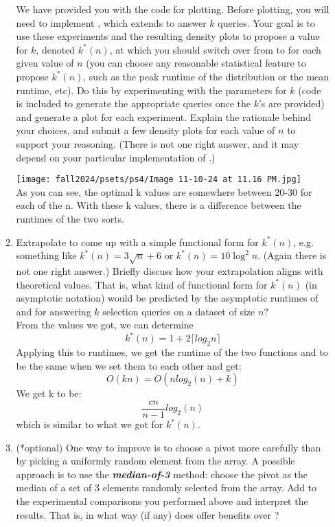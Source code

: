 \documentclass[11pt]{article}
\begin{document}
\begin{enumerate}
\begin{enumerate}
        We have provided you with the code for plotting. Before plotting, you will need to implement \MergeSortSelect{}, which extends \MergeSort{} to answer $k$ queries. Your goal is to use these experiments and the resulting density plots to propose a value for $k$, denoted $k^*(n)$, at which you should switch over from \QuickSelect{} to \MergeSortSelect{} for each given value of $n$ (you can choose any reasonable statistical feature to propose $k^*(n)$, such as the peak runtime of the distribution or the mean runtime, etc). Do this by experimenting with the parameters for $k$ (code is included to generate the appropriate queries once the $k$'s are provided) and generate a plot for each experiment.  Explain the rationale behind your choices, and submit a few density plots for each value of $n$ to support your reasoning.  (There is not one right answer, and it may depend on your particular implementation of \QuickSelect{}.) 

        \texttt{[image: fall2024/psets/ps4/Image 11-10-24 at 11.16 PM.jpg]}
        \\ As you can see, the optimal k values are somewhere between 20-30 for each of the n. With these k values, there is a difference between the runtimes of the two sorts.
        \item Extrapolate to come up with a simple functional form for $k^*(n)$, e.g. something like $k^*(n)=3\sqrt{n}+6$ or $k^*(n)=10\log^2 n$. (Again there is not one right answer.)  Briefly discuss how your extrapolation aligns with theoretical values. That is, what kind of functional form for $k^*(n)$ (in asymptotic notation) would be predicted by  the asymptotic runtimes of \QuickSelect{} and \MergeSortSelect{} for answering $k$ selection queries on a dataset of size $n$? 
        \\ From the values we got, we can determine $$k^*(n) = 1 + 2\lceil log_2n \rceil$$
        Applying this to runtimes, we get the runtime of the two functions \MergeSort{} and \QuickSelect{} to be the same when we set them to each other and get:
        $$O(kn) = O(nlog_2(n) + k)$$
        We get k to be:
        $$\frac{cn}{n-1}log_2(n)$$ which is similar to what we got for $k^*(n)$.\\
        
        \item (*optional)  One way to improve \QuickSelect{} is to choose a pivot more carefully than by picking a uniformly random element from the array. A possible approach is to use the \textit{\textbf{median-of-3}} method: choose the pivot as the median of a set of 3 elements randomly selected from the array. Add \MedianQuickSelect{} to the experimental comparisons you performed above and interpret the results.  That is, in what way (if any) does \MedianQuickSelect{} offer benefits over \QuickSelect{}?        
        

\end{enumerate}
\end{enumerate}
\end{document}
